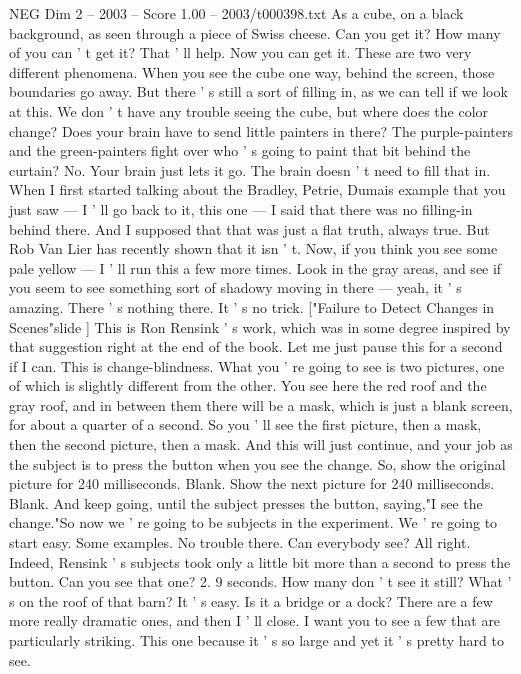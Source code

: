 \begin{textsample}{NEG Dim 2 – 2003 – Score 1.00 – 2003/t000398.txt}
As a cube, on a black background, as seen through a piece of Swiss cheese.
Can you get it?
How many of you can ' t get it?
That ' ll help.
Now you can get it.
These are two very different phenomena.
When you see the cube one way, behind the screen, those boundaries go away.
But there ' s still a sort of filling in, as we can tell if we look at this.
We don ' t have any trouble seeing the cube, but where does the color change?
Does your brain have to send little painters in there?
The purple-painters and the green-painters fight over who ' s going to paint that bit behind the curtain?
No.
Your brain just lets it go.
The brain doesn ' t need to fill that in.
When I first started talking about the Bradley, Petrie, Dumais example that you just saw — I ' ll go back to it, this one — I said that there was no filling-in behind there.
And I supposed that that was just a flat truth, always true.
But Rob Van Lier has recently shown that it isn ' t.
Now, if you think you see some pale yellow — I ' ll run this a few more times.
Look in the gray areas, and see if you seem to see something sort of shadowy moving in there — yeah, it ' s amazing.
There ' s nothing there.
It ' s no trick. ["Failure to Detect Changes in Scenes"slide ] This is Ron Rensink ' s work, which was in some degree inspired by that suggestion right at the end of the book.
Let me just pause this for a second if I can.
This is change-blindness.
What you ' re going to see is two pictures, one of which is slightly different from the other.
You see here the red roof and the gray roof, and in between them there will be a mask, which is just a blank screen, for about a quarter of a second.
So you ' ll see the first picture, then a mask, then the second picture, then a mask.
And this will just continue, and your job as the subject is to press the button when you see the change.
So, show the original picture for 240 milliseconds.
Blank.
Show the next picture for 240 milliseconds.
Blank.
And keep going, until the subject presses the button, saying,"I see the change."So now we ' re going to be subjects in the experiment.
We ' re going to start easy.
Some examples.
No trouble there.
Can everybody see?
All right.
Indeed, Rensink ' s subjects took only a little bit more than a second to press the button.
Can you see that one? 2. 9 seconds.
How many don ' t see it still?
What ' s on the roof of that barn?
It ' s easy.
Is it a bridge or a dock?
There are a few more really dramatic ones, and then I ' ll close.
I want you to see a few that are particularly striking.
This one because it ' s so large and yet it ' s pretty hard to see.

\end{textsample}
